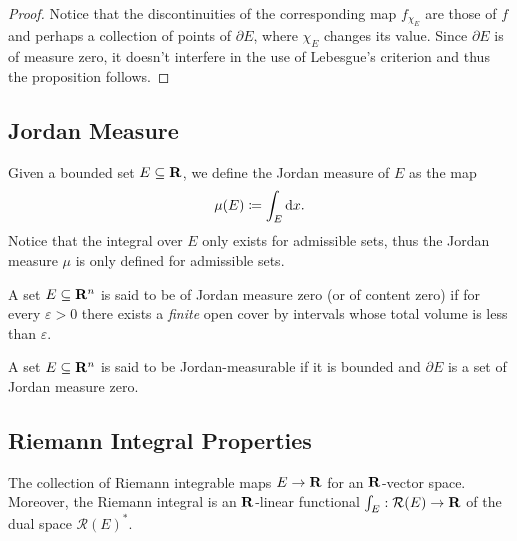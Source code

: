 \begin{proof}
    Notice that the discontinuities of the corresponding map \(f_{\chi_E}\) are
    those of \(f\) and perhaps a collection of points of \(\partial E\), where
    \(\chi_E\) changes its value. Since \(\partial E\) is of measure zero, it doesn't
    interfere in the use of Lebesgue's criterion and thus the proposition follows.
\end{proof}

\subsection{Jordan Measure}

\begin{definition}
    \label{def:jordan-measure}
    Given a bounded set \(E \subseteq \mathbf{R}\), we define the Jordan measure of \(E\) as
    the map
    \[
        \mu(E) \coloneq \int_E \mathrm{d} x.
    \]
    Notice that the integral over \(E\) only exists for admissible sets, thus the
    Jordan measure \(\mu\) is only defined for admissible sets.
\end{definition}

\begin{definition}
    \label{def:jordan-measure-zero}
    A set \(E \subseteq \mathbf{R}^n\) is said to be of Jordan measure zero (or of content
    zero) if for every \(\varepsilon > 0\) there exists a \emph{finite} open cover
    by intervals whose total volume is less than \(\varepsilon\).
\end{definition}

\begin{definition}
    \label{def:jordan-measurable}
    A set \(E \subseteq \mathbf{R}^n\) is said to be Jordan-measurable if it is bounded and
    \(\partial E\) is a set of Jordan measure zero.
\end{definition}

\subsection{Riemann Integral Properties}

\begin{corollary}
    The collection of Riemann integrable maps \(E \to \mathbf{R}\) for an \(\mathbf{R}\)-vector
    space. Moreover, the Riemann integral is an \(\mathbf{R}\)-linear functional \(\int_E:
    \mathcal R(E) \to \mathbf{R}\) of the dual space \(\mathcal R(E)^{*}\).
\end{corollary}

